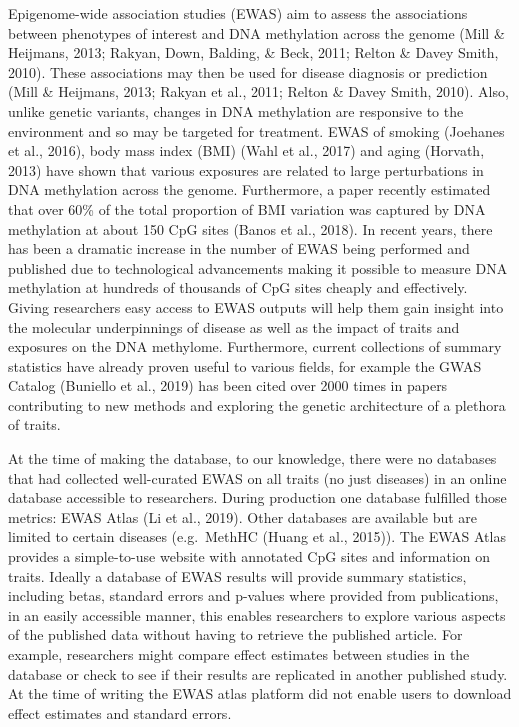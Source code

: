 \documentclass[11pt,twoside]{bristolthesis}
\begin{document}
Epigenome-wide association studies (EWAS) aim to assess the associations between phenotypes of interest and DNA methylation across the genome (Mill \& Heijmans, 2013; Rakyan, Down, Balding, \& Beck, 2011; Relton \& Davey Smith, 2010). These associations may then be used for disease diagnosis or prediction (Mill \& Heijmans, 2013; Rakyan et al., 2011; Relton \& Davey Smith, 2010). Also, unlike genetic variants, changes in DNA methylation are responsive to the environment and so may be targeted for treatment. EWAS of smoking (Joehanes et al., 2016), body mass index (BMI) (Wahl et al., 2017) and aging (Horvath, 2013) have shown that various exposures are related to large perturbations in DNA methylation across the genome. Furthermore, a paper recently estimated that over 60\% of the total proportion of BMI variation was captured by DNA methylation at about 150 CpG sites (Banos et al., 2018). In recent years, there has been a dramatic increase in the number of EWAS being performed and published due to technological advancements making it possible to measure DNA methylation at hundreds of thousands of CpG sites cheaply and effectively. Giving researchers easy access to EWAS outputs will help them gain insight into the molecular underpinnings of disease as well as the impact of traits and exposures on the DNA methylome. Furthermore, current collections of summary statistics have already proven useful to various fields, for example the GWAS Catalog (Buniello et al., 2019) has been cited over 2000 times in papers contributing to new methods and exploring the genetic architecture of a plethora of traits.

At the time of making the database, to our knowledge, there were no databases that had collected well-curated EWAS on all traits (no just diseases) in an online database accessible to researchers. During production one database fulfilled those metrics: EWAS Atlas (Li et al., 2019). Other databases are available but are limited to certain diseases (e.g.~MethHC (Huang et al., 2015)). The EWAS Atlas provides a simple-to-use website with annotated CpG sites and information on traits. Ideally a database of EWAS results will provide summary statistics, including betas, standard errors and p-values where provided from publications, in an easily accessible manner, this enables researchers to explore various aspects of the published data without having to retrieve the published article. For example, researchers might compare effect estimates between studies in the database or check to see if their results are replicated in another published study. At the time of writing the EWAS atlas platform did not enable users to download effect estimates and standard errors.
\end{document}
